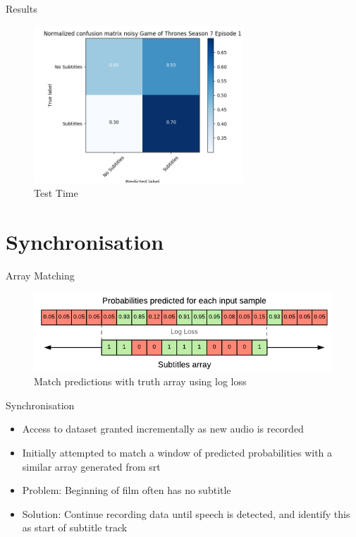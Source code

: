 \documentclass[notes]{beamer}
\begin{document}
\begin{frame}{Results}

\begin{figure}
	\includegraphics[width=0.7\textwidth]{figures/CM_gots7e1_noisy}
	\caption{Test Time}
\end{figure}

\end{frame}

\section{Synchronisation}

\begin{frame}{Array Matching}
\begin{figure}
	\includegraphics[width=\textwidth]{figures/Array_Matching}
	\caption{Match predictions with truth array using log loss \cite{Sabater_2017}}
\end{figure}
\end{frame}
\begin{frame}{Synchronisation}
\begin{itemize}
	\item Access to dataset granted incrementally as new audio is recorded
	\item Initially attempted to match a window of predicted probabilities with a similar array generated from srt
	\item Problem: Beginning of film often has no subtitle
	\item Solution: Continue recording data until speech is detected, and identify this as start of subtitle track
\end{itemize}
\end{frame}
\end{document}
